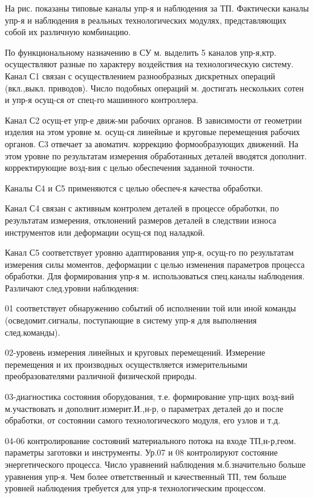 \documentclass[unicode, 12pt, a4paper, oneside]{article}
\begin{document}
На рис. показаны типовые каналы упр-я и наблюдения за ТП. Фактически каналы упр-я и наблюдения в реальных технологических модулях, представляющих собой их различную комбинацию.

По функциональному назначению в СУ м. выделить 5 каналов упр-я,ктр. осуществляют разные по характеру воздействия на технологическую систему. 
Канал С1 связан с осуществлением разнообразных дискретных операций (вкл.,выкл. приводов). Число подобных операций м. достигать нескольких сотен и упр-я осущ-ся от спец-го машинного контроллера.

Канал С2 осущ-ет упр-е движ-ми рабочих органов. В зависимости от геометрии изделия на этом уровне м. осущ-ся линейные и круговые перемещения рабочих органов.
С3 отвечает за авоматич. коррекцию формообразующих движений. На этом уровне по результатам измерения обработанных деталей вводятся дополнит. корректирующие возд-вия с целью обеспечения заданной точности.

Каналы С4 и С5 применяются с целью обеспеч-я качества обработки.

Канал С4 связан с активным контролем деталей в процессе обработки, по результатам измерения, отклонений размеров деталей в следствии износа инструментов или деформации осущ-ся под наладкой.

Канал С5 соответствует уровню адаптирования упр-я, осущ-го по результатам измерения силы моментов, деформации с целью изменения параметров процесса обработки.
Для формирования упр-я м. использоваться спец.каналы наблюдения. Различают след.уровни наблюдения:

01 соответствует обнаружению событий об исполнении той или иной команды (осведомит.сигналы, поступающие в систему упр-я для выполнения след.команды).

02-уровень измерения линейных и круговых перемещений. Измерение перемещения и их производных осуществляется измерительными преобразователями различной физической природы.

03-диагностика состояния оборудования, т.е. формирование упр-щих возд-вий м.участвовать и дополнит.измерит.И.,н-р, о параметрах деталей до и после обработки, от состоянии самого технологического модуля, его узлов и т.д.

04-06 контролирование состояний материального потока на входе ТП,н-р,геом. параметры заготовки и инструменты.
Ур.07 и 08 контролируют состояние энергетического процесса. Число уравнений наблюдения м.б.значительно больше уравнения упр-я. Чем более ответственный и качественный ТП, тем больше уровней наблюдения требуется для упр-я технологическим процессом.
\end{document}
